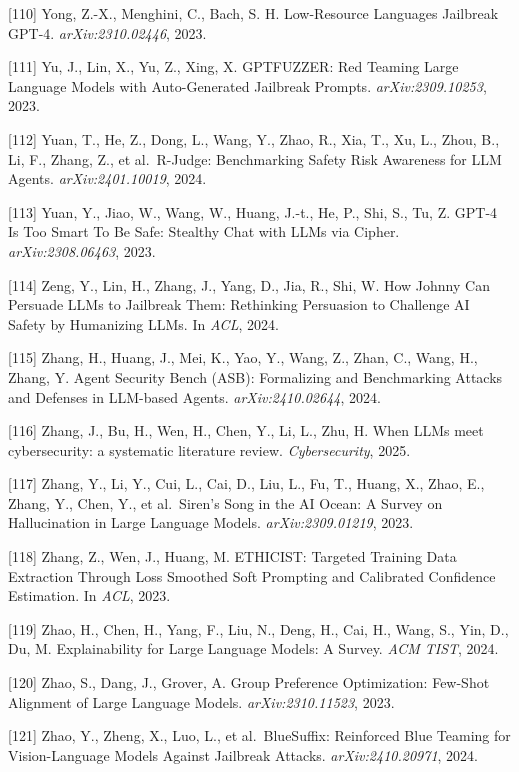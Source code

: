 {[}110{]} Yong, Z.-X., Menghini, C., Bach, S. H. Low-Resource Languages Jailbreak GPT-4. \emph{arXiv:2310.02446}, 2023.

{[}111{]} Yu, J., Lin, X., Yu, Z., Xing, X. GPTFUZZER: Red Teaming Large Language Models with Auto-Generated Jailbreak Prompts. \emph{arXiv:2309.10253}, 2023.

{[}112{]} Yuan, T., He, Z., Dong, L., Wang, Y., Zhao, R., Xia, T., Xu, L., Zhou, B., Li, F., Zhang, Z., et al.~R-Judge: Benchmarking Safety Risk Awareness for LLM Agents. \emph{arXiv:2401.10019}, 2024.

{[}113{]} Yuan, Y., Jiao, W., Wang, W., Huang, J.-t., He, P., Shi, S., Tu, Z. GPT-4 Is Too Smart To Be Safe: Stealthy Chat with LLMs via Cipher. \emph{arXiv:2308.06463}, 2023.

{[}114{]} Zeng, Y., Lin, H., Zhang, J., Yang, D., Jia, R., Shi, W. How Johnny Can Persuade LLMs to Jailbreak Them: Rethinking Persuasion to Challenge AI Safety by Humanizing LLMs. In \emph{ACL}, 2024.

{[}115{]} Zhang, H., Huang, J., Mei, K., Yao, Y., Wang, Z., Zhan, C., Wang, H., Zhang, Y. Agent Security Bench (ASB): Formalizing and Benchmarking Attacks and Defenses in LLM-based Agents. \emph{arXiv:2410.02644}, 2024.

{[}116{]} Zhang, J., Bu, H., Wen, H., Chen, Y., Li, L., Zhu, H. When LLMs meet cybersecurity: a systematic literature review. \emph{Cybersecurity}, 2025.

{[}117{]} Zhang, Y., Li, Y., Cui, L., Cai, D., Liu, L., Fu, T., Huang, X., Zhao, E., Zhang, Y., Chen, Y., et al.~Siren's Song in the AI Ocean: A Survey on Hallucination in Large Language Models. \emph{arXiv:2309.01219}, 2023.

{[}118{]} Zhang, Z., Wen, J., Huang, M. ETHICIST: Targeted Training Data Extraction Through Loss Smoothed Soft Prompting and Calibrated Confidence Estimation. In \emph{ACL}, 2023.

{[}119{]} Zhao, H., Chen, H., Yang, F., Liu, N., Deng, H., Cai, H., Wang, S., Yin, D., Du, M. Explainability for Large Language Models: A Survey. \emph{ACM TIST}, 2024.

{[}120{]} Zhao, S., Dang, J., Grover, A. Group Preference Optimization: Few-Shot Alignment of Large Language Models. \emph{arXiv:2310.11523}, 2023.

{[}121{]} Zhao, Y., Zheng, X., Luo, L., et al.~BlueSuffix: Reinforced Blue Teaming for Vision-Language Models Against Jailbreak Attacks. \emph{arXiv:2410.20971}, 2024.

